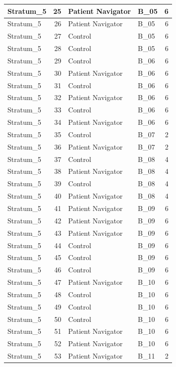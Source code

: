 \documentclass[
]{book}
\begin{document}
\begin{table}[H]
\begin{tabular}{l|r|l|l|r}
\hline
Stratum\_5 & 25 & Patient Navigator & B\_05 & 6\\
\hline
Stratum\_5 & 26 & Patient Navigator & B\_05 & 6\\
\hline
Stratum\_5 & 27 & Control & B\_05 & 6\\
\hline
Stratum\_5 & 28 & Control & B\_05 & 6\\
\hline
Stratum\_5 & 29 & Control & B\_06 & 6\\
\hline
Stratum\_5 & 30 & Patient Navigator & B\_06 & 6\\
\hline
Stratum\_5 & 31 & Control & B\_06 & 6\\
\hline
Stratum\_5 & 32 & Patient Navigator & B\_06 & 6\\
\hline
Stratum\_5 & 33 & Control & B\_06 & 6\\
\hline
Stratum\_5 & 34 & Patient Navigator & B\_06 & 6\\
\hline
Stratum\_5 & 35 & Control & B\_07 & 2\\
\hline
Stratum\_5 & 36 & Patient Navigator & B\_07 & 2\\
\hline
Stratum\_5 & 37 & Control & B\_08 & 4\\
\hline
Stratum\_5 & 38 & Patient Navigator & B\_08 & 4\\
\hline
Stratum\_5 & 39 & Control & B\_08 & 4\\
\hline
Stratum\_5 & 40 & Patient Navigator & B\_08 & 4\\
\hline
Stratum\_5 & 41 & Patient Navigator & B\_09 & 6\\
\hline
Stratum\_5 & 42 & Patient Navigator & B\_09 & 6\\
\hline
Stratum\_5 & 43 & Patient Navigator & B\_09 & 6\\
\hline
Stratum\_5 & 44 & Control & B\_09 & 6\\
\hline
Stratum\_5 & 45 & Control & B\_09 & 6\\
\hline
Stratum\_5 & 46 & Control & B\_09 & 6\\
\hline
Stratum\_5 & 47 & Patient Navigator & B\_10 & 6\\
\hline
Stratum\_5 & 48 & Control & B\_10 & 6\\
\hline
Stratum\_5 & 49 & Control & B\_10 & 6\\
\hline
Stratum\_5 & 50 & Control & B\_10 & 6\\
\hline
Stratum\_5 & 51 & Patient Navigator & B\_10 & 6\\
\hline
Stratum\_5 & 52 & Patient Navigator & B\_10 & 6\\
\hline
Stratum\_5 & 53 & Patient Navigator & B\_11 & 2\\

\end{tabular}
\end{table}
\end{document}
